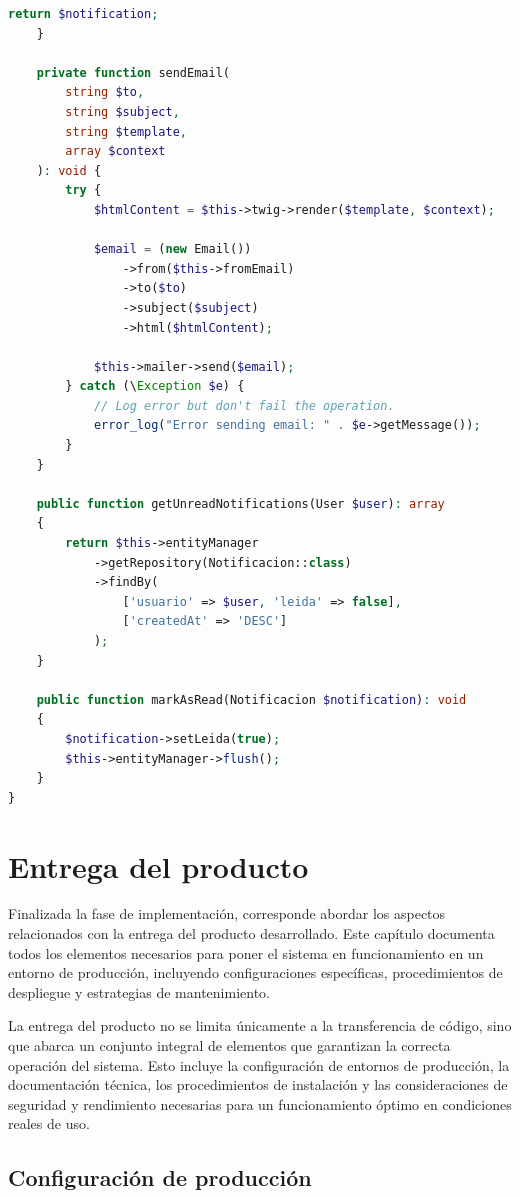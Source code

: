\documentclass[12pt,a4paper,oneside]{report}
\begin{document}
\begin{lstlisting}[language=PHP]
        return $notification;
    }

    private function sendEmail(
        string $to,
        string $subject,
        string $template,
        array $context
    ): void {
        try {
            $htmlContent = $this->twig->render($template, $context);

            $email = (new Email())
                ->from($this->fromEmail)
                ->to($to)
                ->subject($subject)
                ->html($htmlContent);

            $this->mailer->send($email);
        } catch (\Exception $e) {
            // Log error but don't fail the operation.
            error_log("Error sending email: " . $e->getMessage());
        }
    }

    public function getUnreadNotifications(User $user): array
    {
        return $this->entityManager
            ->getRepository(Notificacion::class)
            ->findBy(
                ['usuario' => $user, 'leida' => false],
                ['createdAt' => 'DESC']
            );
    }

    public function markAsRead(Notificacion $notification): void
    {
        $notification->setLeida(true);
        $this->entityManager->flush();
    }
}
\end{lstlisting}

\chapter{Entrega del producto}\label{entrega-del-producto}
Finalizada la fase de implementación, corresponde abordar los aspectos
relacionados con la entrega del producto desarrollado. Este capítulo
documenta todos los elementos necesarios para poner el sistema en
funcionamiento en un entorno de producción, incluyendo configuraciones
específicas, procedimientos de despliegue y estrategias de
mantenimiento.

La entrega del producto no se limita únicamente a la transferencia de
código, sino que abarca un conjunto integral de elementos que garantizan
la correcta operación del sistema. Esto incluye la configuración de
entornos de producción, la documentación técnica, los procedimientos de
instalación y las consideraciones de seguridad y rendimiento necesarias
para un funcionamiento óptimo en condiciones reales de uso.

\section{Configuración de
producción}\label{configuraciuxf3n-de-producciuxf3n}
\end{document}
